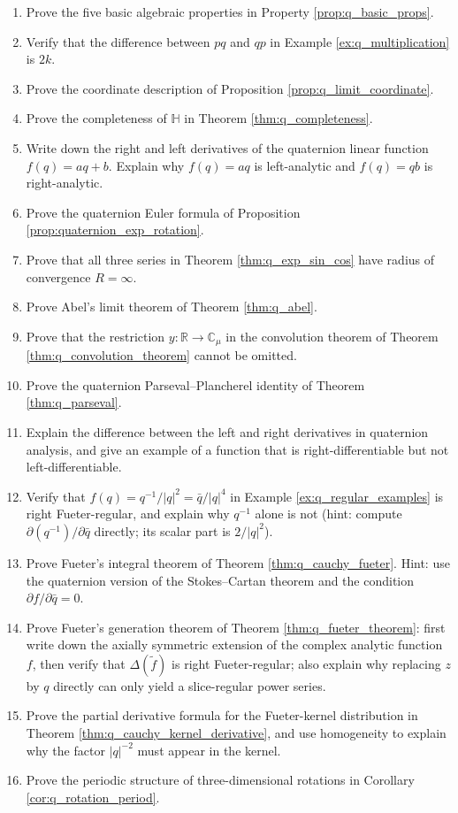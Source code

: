 \begin{enumerate}[leftmargin=3em, label=\textbf{Exercise \arabic*}]
    \item Prove the five basic algebraic properties in Property \ref{prop:q_basic_props}.
    \item Verify that the difference between $pq$ and $qp$ in Example \ref{ex:q_multiplication} is $2k$.
    \item Prove the coordinate description of Proposition \ref{prop:q_limit_coordinate}.
    \item Prove the completeness of $\mathbb{H}$ in Theorem \ref{thm:q_completeness}.
    \item Write down the right and left derivatives of the quaternion linear function $f(q)=aq+b$. Explain why $f(q)=aq$ is left-analytic and $f(q)=qb$ is right-analytic.
    \item Prove the quaternion Euler formula of Proposition \ref{prop:quaternion_exp_rotation}.
    \item Prove that all three series in Theorem \ref{thm:q_exp_sin_cos} have radius of convergence $R=\infty$.
    \item Prove Abel's limit theorem of Theorem \ref{thm:q_abel}.
    \item Prove that the restriction $y:\mathbb{R}\to\mathbb{C}_\mu$ in the convolution theorem of Theorem \ref{thm:q_convolution_theorem} cannot be omitted.
    \item Prove the quaternion Parseval--Plancherel identity of Theorem \ref{thm:q_parseval}.
    \item Explain the difference between the left and right derivatives in quaternion analysis, and give an example of a function that is right-differentiable but not left-differentiable.
    \item Verify that $f(q)=q^{-1}/|q|^2=\bar q/|q|^4$ in Example \ref{ex:q_regular_examples} is right Fueter-regular, and explain why $q^{-1}$ alone is not (hint: compute $\partial(q^{-1})/\partial\bar q$ directly; its scalar part is $2/|q|^2$).
    \item Prove Fueter's integral theorem of Theorem \ref{thm:q_cauchy_fueter}. Hint: use the quaternion version of the Stokes--Cartan theorem and the condition $\partial f/\partial \bar q=0$.
    \item Prove Fueter's generation theorem of Theorem \ref{thm:q_fueter_theorem}: first write down the axially symmetric extension of the complex analytic function $f$, then verify that $\Delta(\tilde f)$ is right Fueter-regular; also explain why replacing $z$ by $q$ directly can only yield a slice-regular power series.
    \item Prove the partial derivative formula for the Fueter-kernel distribution in Theorem \ref{thm:q_cauchy_kernel_derivative}, and use homogeneity to explain why the factor $|q|^{-2}$ must appear in the kernel.
    \item Prove the periodic structure of three-dimensional rotations in Corollary \ref{cor:q_rotation_period}.
\end{enumerate}


